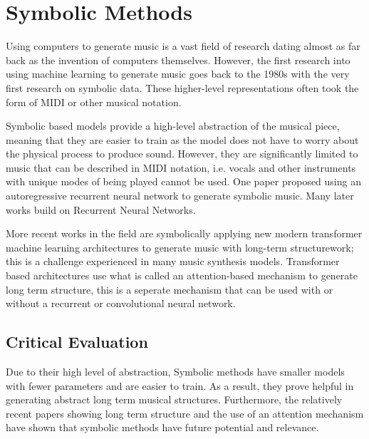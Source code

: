 \section{Symbolic Methods}

Using computers to generate music is a vast field of research dating almost as far back as the invention of computers themselves\cite{Hiller1958Musical}. However, the first research into using machine learning to generate music goes back to the 1980s\cite{ConnectionistComposition}\cite{GradientDescentLearning} with the very first research on symbolic data. These higher-level representations often took the form of MIDI or other musical notation.

Symbolic based models provide a high-level abstraction of the musical piece, meaning that they are easier to train as the model does not have to worry about the physical process to produce sound. However, they are significantly limited to music that can be described in MIDI notation, i.e. vocals and other instruments with unique modes of being played cannot be used. One paper proposed using an autoregressive recurrent neural network to generate symbolic music. Many later works build on Recurrent Neural Networks.

\vspace{0.5cm}
\vspace{0.5cm}

More recent works in the field are symbolically applying new modern transformer machine learning architectures to generate music with long-term structurework\cite{LongTermStructure}; this is a challenge experienced in many music synthesis models. Transformer based architectures use what is called an attention-based mechanism to generate long term structure\cite{Attention}, this is a seperate mechanism that can be used with or without a recurrent or convolutional neural network.


\subsection{Critical Evaluation}

Due to their high level of abstraction, Symbolic methods have smaller models with fewer parameters and are easier to train. As a result, they prove helpful in generating abstract long term musical structures. Furthermore, the relatively recent papers showing long term structure\cite{LongTermStructure} and the use of an attention mechanism\cite{Attention} have shown that symbolic methods have future potential and relevance.

